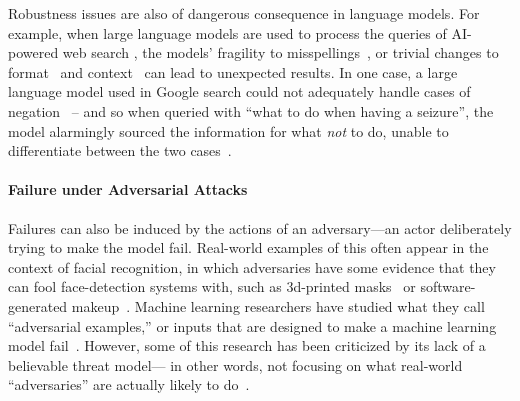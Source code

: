 \documentclass[acmconf,manuscript,screen,natbib=true]{acmart}
\begin{document}

Robustness issues are also of dangerous consequence in language models. 
For example, when large language models are used to process the queries of AI-powered web search \cite{nayak2019understanding}, the models' fragility to 
misspellings~\cite{moradi2021evaluating, pruthi2019combating}, or trivial changes to  format~\cite{bender2020climbing} and context~\cite{bender2021dangers} can lead to unexpected results. In one case, a large language model used in Google search could not adequately handle cases of  negation~\cite{ettinger2020bert} -- and so when queried with ``what to do when having a seizure'', the model alarmingly sourced the information for what \emph{not} to do, unable to differentiate between the two cases~\cite{goog_search_fail}. 


\paragraph{Failure under Adversarial Attacks}

Failures can also be induced by the actions of an adversary---an actor deliberately trying to make the model fail. Real-world examples of this often appear in the context of facial recognition, in which adversaries have some evidence that they can fool face-detection systems with, such as 3d-printed masks~\cite{3d_printed_masks} or software-generated makeup~\cite{makeup}. Machine learning researchers have studied what they call “adversarial examples,” or inputs that are designed to make a machine learning model fail~\cite{adversarial_examples}. However, some of this research has been criticized by its lack of a believable threat model— in other words, not focusing on what real-world “adversaries” are actually likely to do~\cite{catherine_olsson}.
\end{document}
